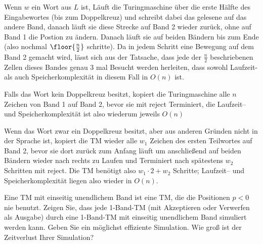 \documentclass[listings, a4paper, 11pt]{homeworkassignment}
\newcommand{\task}[1]{
  \begin{framed}
    \keyword{Problem:} #1
  \end{framed}
}
\begin{document}
Wenn \(w\) ein Wort aus \(L\) ist, Läuft die Turingmaschine über die
erste Hälfte des Eingabewortes (bis zum Doppelkreuz) und schreibt
dabei das gelesene auf das andere Band, danach läuft sie diese Strecke
auf Band 2 wieder zurück, ohne auf Band 1 die Postion zu
ändern. Danach läuft sie auf beiden Bändern bis zum Ende (also nochmal
\(\floor{\frac{n}{2}}\) schritte). Da in jedem Schritt eine Bewegung
auf dem Band 2 gemacht wird, lässt sich aus der Tatsache, dass jede
der \(\frac{n}{2}\) beschriebenen Zellen dieses Bandes genau 3 mal
Besucht werden herleiten, dass sowohl Laufzeit- als auch
Speicherkomplexität in diesem Fall in \(O(n)\) ist.

Falls das Wort kein Doppelkreuz besitzt, kopiert die Turingmaschine
alle \(n\) Zeichen von Band 1 auf Band 2, bevor sie mit \textsf{reject}
Terminiert, die Laufzeit-- und Speicherkomplexität ist also wiederum
jeweils \(O(n)\)


Wenn das Wort zwar ein Doppelkreuz besitzt, aber aus anderen Gründen
nicht in der Sprache ist, kopiert die TM wieder alle \(w_1\) Zeichen des
ersten Teilwortes auf Band 2, bevor sie dort zurück zum Anfang läuft
um anschließend auf beiden Bändern wieder nach rechts zu Laufen und
Terminiert nach spätestens \(w_2\) Schritten mit
\textsf{reject}. Die TM benötigt also \(w_1\cdot2+w_2\) Schritte; Laufzeit--
und Speicherkomplexität liegen also wieder in \(O(n)\).
\task{Eine TM mit einseitig unendlichem Band ist eine TM, die die
  Positionen \(p < 0\) nie benutzt. Zeigen Sie, dass jede 1-Band-TM
  (mit Akzeptieren oder Verwerfen als Ausgabe) durch eine 1-Band-TM
  mit einseitig unendlichem Band simuliert werden kann. Geben Sie ein
  möglichst effiziente Simulation. Wie groß ist der Zeitverlust Ihrer
  Simulation?} 
\end{document}
